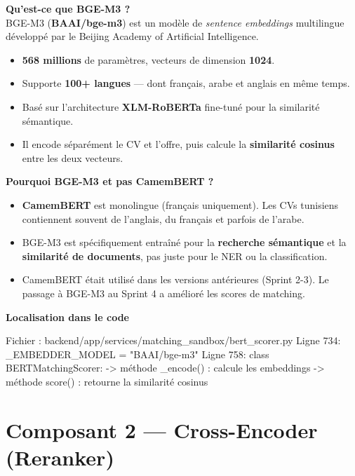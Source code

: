 \documentclass[12pt,a4paper]{report}
\newenvironment{infobox}[1][]{%
  \begin{framed}\noindent\textbf{\textcolor{navyblue}{#1}}\\[2pt]%
}{\end{framed}}
\newenvironment{codebox}[1][]{%
  \begin{framed}\noindent\textbf{\small\textcolor{codeblue}{#1}}\\[2pt]\ttfamily\small%
}{\end{framed}}
\newenvironment{whybox}[1][Pourquoi ce choix ?]{%
  \colorbox{yellow!20}{\textbf{\textcolor{navyblue}{#1}}}\vspace{2pt}
  \begin{framed}%
}{\end{framed}}
\begin{document}
\begin{infobox}[Qu'est-ce que BGE-M3 ?]
BGE-M3 (\textbf{BAAI/bge-m3}) est un modèle de \textit{sentence embeddings}
multilingue développé par le Beijing Academy of Artificial Intelligence.
\begin{itemize}
  \item \textbf{568 millions} de paramètres, vecteurs de dimension \textbf{1024}.
  \item Supporte \textbf{100+ langues} — dont français, arabe et anglais en même temps.
  \item Basé sur l'architecture \textbf{XLM-RoBERTa} fine-tuné pour la similarité sémantique.
  \item Il encode séparément le CV et l'offre, puis calcule la \textbf{similarité cosinus}
        entre les deux vecteurs.
\end{itemize}
\end{infobox}

\begin{whybox}[Pourquoi BGE-M3 et pas CamemBERT ?]
\begin{itemize}
  \item \textbf{CamemBERT} est monolingue (français uniquement). Les CVs tunisiens
        contiennent souvent de l'anglais, du français et parfois de l'arabe.
  \item BGE-M3 est spécifiquement entraîné pour la \textbf{recherche sémantique} et
        la \textbf{similarité de documents}, pas juste pour le NER ou la classification.
  \item CamemBERT était utilisé dans les versions antérieures (Sprint 2-3).
        Le passage à BGE-M3 au Sprint 4 a amélioré les scores de matching.
\end{itemize}
\end{whybox}

\begin{codebox}[Localisation dans le code]
Fichier  : backend/app/services/matching_sandbox/bert_scorer.py
Ligne 734: _EMBEDDER_MODEL = "BAAI/bge-m3"
Ligne 758: class BERTMatchingScorer:
           -> méthode _encode() : calcule les embeddings
           -> méthode score() : retourne la similarité cosinus
\end{codebox}

\section{Composant 2 — Cross-Encoder (Reranker)}
\end{document}
